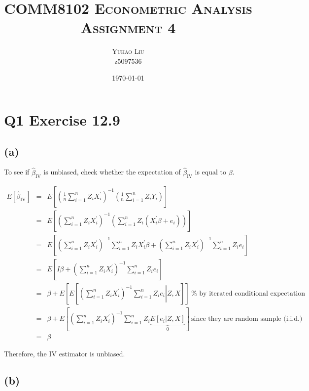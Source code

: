 \documentclass{article}
\begin{document}
\title{ \textsc{COMM8102 Econometric Analysis} \\
\textsc{Assignment 4}}
\author{\textsc{Yuhao Liu} \\
{\small z5097536}}
\date{{\small \today}}
\maketitle

\section*{Q1 Exercise 12.9}

\subsection*{(a)}

To see if $\hat{\beta}_{\text{IV}}$ is unbiased, check whether the
expectation of $\hat{\beta}_{\text{IV}}$ is equal to $\beta $.

\begin{eqnarray*}
E\left[ \hat{\beta}_{\text{IV}}\right] &=&E\left[ \left( \frac{1}{n}%
\sum_{i=1}^{n}Z_{i}X_{i}^{\prime }\right) ^{-1}\left( \frac{1}{n}%
\sum_{i=1}^{n}Z_{i}Y_{i}\right) \right] \\
&=&E\left[ \left( \sum_{i=1}^{n}Z_{i}X_{i}^{\prime }\right) ^{-1}\left(
\sum_{i=1}^{n}Z_{i}\left( X_{i}^{\prime }\beta +e_{i}\right) \right) \right]
\\
&=&E\left[ \left( \sum_{i=1}^{n}Z_{i}X_{i}^{\prime }\right)
^{-1}\sum_{i=1}^{n}Z_{i}X_{i}^{\prime }\beta +\left(
\sum_{i=1}^{n}Z_{i}X_{i}^{\prime }\right) ^{-1}\sum_{i=1}^{n}Z_{i}e_{i}%
\right] \\
&=&E\left[ I\beta +\left( \sum_{i=1}^{n}Z_{i}X_{i}^{\prime }\right)
^{-1}\sum_{i=1}^{n}Z_{i}e_{i}\right] \\
&=&\beta +E\left[ E\left[ \left. \left( \sum_{i=1}^{n}Z_{i}X_{i}^{\prime
}\right) ^{-1}\sum_{i=1}^{n}Z_{i}e_{i}\right\vert Z,X\right] \right] ~\text{%
by iterated conditional expectation } \\
&=&\beta +E\left[ \left( \sum_{i=1}^{n}Z_{i}X_{i}^{\prime }\right)
^{-1}\sum_{i=1}^{n}Z_{i}\underset{0}{\underbrace{E\left[ \left.
e_{i}\right\vert Z,X\right] }}\right] ~\text{since they are random sample
(i.i.d.)} \\
&=&\beta
\end{eqnarray*}

Therefore, the IV estimator is unbiased.

\subsection*{(b)}
\end{document}
